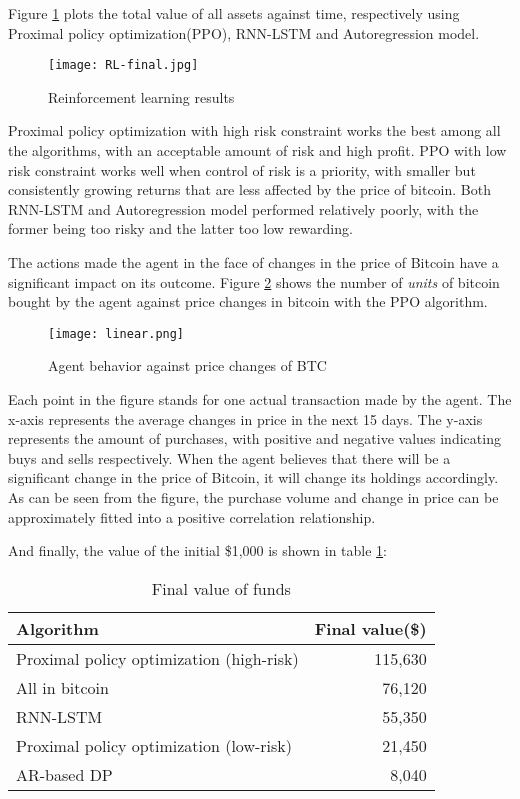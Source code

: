 \documentclass{mcmthesis}
\begin{document}
Figure \ref{RL-Results}  plots the total value of all assets against time,
respectively using Proximal policy optimization(PPO), RNN-LSTM and Autoregression model.

\begin{figure}[h]
  \small
  \centering
  \texttt{[image: RL-final.jpg]}
  \caption{Reinforcement learning results} \label{RL-Results}
\end{figure}

Proximal policy optimization with high risk constraint works the best among all the algorithms, with an acceptable amount of risk and high profit. PPO with low risk constraint works well when control of risk is a priority, with smaller but consistently growing returns that are less affected by the price of bitcoin. Both RNN-LSTM and Autoregression model performed relatively poorly, with the former being too risky and the latter too low rewarding.

The actions made the agent in the face of changes in the price of Bitcoin have a significant impact on its outcome.
Figure \ref{BTC} shows the number of \textit{units} of bitcoin bought by the agent against price changes in bitcoin with the PPO algorithm.

\begin{figure}[h]
  \small
  \centering
  \texttt{[image: linear.png]}
  \caption{Agent behavior against price changes of BTC} \label{BTC}
\end{figure}

Each point in the figure stands for one actual transaction made by the agent.
The x-axis represents the average changes in price in the next 15 days.
The y-axis represents the amount of purchases, with positive and negative values indicating buys and sells respectively.
When the agent believes that there will be a significant change in the price of Bitcoin, it will change its holdings accordingly.
As can be seen from the figure, the purchase volume and change in price can be approximately fitted into a positive correlation relationship.

And finally, the value of the initial \$1,000 is shown in table \ref{final-value}:

\begin{table}[h]
  \centering
  \begin{tabular}{@{}lr@{}}
    \toprule
    Algorithm & Final value(\$) \\
    \midrule
    Proximal policy optimization (high-risk) & 115,630 \\
    {\color{gray} All in bitcoin} & {\color{gray} 76,120} \\
    RNN-LSTM & 55,350 \\
    Proximal policy optimization (low-risk) & 21,450 \\
    AR-based DP & 8,040 \\
    \bottomrule
  \end{tabular}
  \caption{Final value of funds}
  \label{final-value}
\end{table}
\end{document}
